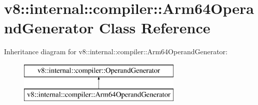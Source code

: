 \hypertarget{classv8_1_1internal_1_1compiler_1_1_arm64_operand_generator}{}\section{v8\+:\+:internal\+:\+:compiler\+:\+:Arm64\+Operand\+Generator Class Reference}
\label{classv8_1_1internal_1_1compiler_1_1_arm64_operand_generator}
Inheritance diagram for v8\+:\+:internal\+:\+:compiler\+:\+:Arm64\+Operand\+Generator\+:\begin{figure}[H]
\begin{center}
\leavevmode
\includegraphics[height=2.000000cm]{classv8_1_1internal_1_1compiler_1_1_arm64_operand_generator}
\end{center}
\end{figure}
